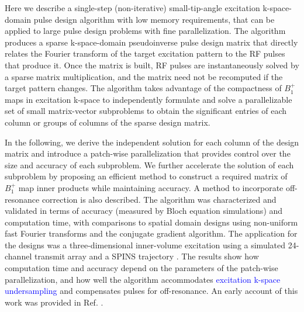 \par Here we describe a single-step (non-iterative) small-tip-angle excitation k-space-domain 
pulse design algorithm with low memory requirements, 
that can be applied to large pulse design problems with fine parallelization. 
The algorithm produces a sparse k-space-domain pseudoinverse pulse design matrix 
that directly relates the Fourier transform of the target excitation pattern to the RF pulses that produce it.
Once the matrix is built, 
RF pulses are instantaneously solved by a sparse matrix multiplication,
and the matrix need not be recomputed if the target pattern changes.
The algorithm takes advantage of the compactness of $B_1^+$ maps in excitation k-space
to independently formulate and solve a parallelizable set of small matrix-vector subproblems 
to obtain the significant entries of each column or groups of columns of the sparse design matrix.  

\par In the following, 
we derive the independent solution for each column of the design matrix 
and introduce a patch-wise parallelization that provides control over the size and accuracy of each subproblem. 
We further accelerate the solution of each subproblem by proposing an efficient method to construct a required
matrix of $B_1^+$ map inner products while maintaining accuracy. 
A method to incorporate off-resonance correction is also described. 
The algorithm was characterized and validated in terms of accuracy (measured by Bloch equation simulations) 
and computation time, with comparisons to spatial domain designs using 
non-uniform fast Fourier transforms and the conjugate gradient algorithm.
The application for the designs was a three-dimensional inner-volume excitation using a simulated 24-channel transmit array
and a SPINS trajectory \cite{malik2012tailored}.
The results show how computation time and accuracy depend on the parameters of the patch-wise parallelization,
and how well the algorithm accommodates \textcolor{blue}{excitation k-space undersampling} and compensates pulses for off-resonance.
An early account of this work was provided in Ref. \cite{grissom:ismrm18}.

